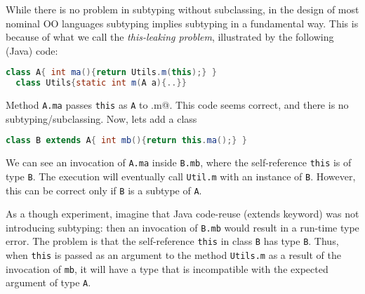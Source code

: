 While there is no problem in subtyping without subclassing, in the design
of most nominal OO languages subtyping implies subtyping in a
fundamental way. This is because of what we call the
\emph{this-leaking problem}, illustrated by the following
(Java) code:

\begin{lstlisting}[language=Java]
  class A{ int ma(){return Utils.m(this);} }
  class Utils{static int m(A a){..}}
\end{lstlisting}

Method \lstinline{A.ma} passes \lstinline{this} as \lstinline{A} to \Q@Util.m@.
This code seems correct, and there is no subtyping/subclassing.  Now, lets add a class \Q@B@

\begin{lstlisting}[language=Java]
  class B extends A{ int mb(){return this.ma();} }  
\end{lstlisting}

We can see an invocation of \lstinline{A.ma} inside
\lstinline{B.mb}, where the self-reference \lstinline{this} is of type \lstinline{B}. 
The execution will eventually call \lstinline{Util.m} with an
instance of \lstinline{B}. However, this can be correct only if \lstinline{B} is a subtype of
\lstinline{A}. 

%
%


As a though experiment, imagine that Java code-reuse (extends keyword) was not introducing subtyping: then an invocation of 
\lstinline{B.mb} would result in a run-time type error.
The problem is that the
self-reference \lstinline{this} in class \lstinline{B} has 
type \lstinline{B}. Thus, when \lstinline{this} is passed as an argument to 
the method \lstinline{Utils.m} as a result of the invocation of
\lstinline{mb}, it will have a type that is incompatible with the
expected argument of type \lstinline{A}.  

